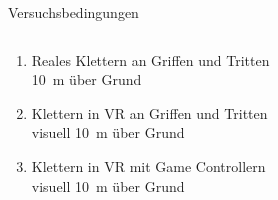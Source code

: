 
\begin{frame}{Versuchsbedingungen}
\begin{columns}
	\begin{column}{0.5\textwidth}
		\begin{enumerate}[label=\textbf\textcolor{tertiary}{\Alph*}]
			\item Reales Klettern an Griffen und Tritten
			\\\textcolor{source}{\SI{10}{\meter} über Grund}
			\item Klettern in \gls{VR} an Griffen und Tritten
			\\\textcolor{source}{visuell \SI{10}{\meter} über Grund}
			\item Klettern in \gls{VR} mit Game Controllern
			\\\textcolor{source}{visuell \SI{10}{\meter} über Grund}
		\end{enumerate}
	\end{column}
	\begin{column}{0.5\textwidth}
		\begin{center}
			\vspace*{-15mm}

\end{center}
\end{column}
\end{columns}
\end{frame}
